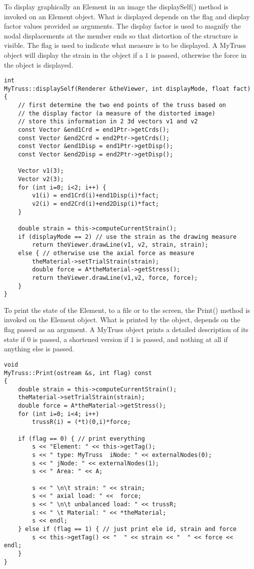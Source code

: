 \documentclass[12pt]{article}
\begin{document}
To display graphically an Element in an image the {\sf displaySelf()}
method is invoked on an Element object. What is displayed depends on
the flag and display factor values provided as arguments. The display
factor is used to magnify the nodal displacements at the member ends
so that distortion of the structure is visible. The flag is used to
indicate what measure is to be displayed. A MyTruss object will
display the strain in the object if a $1$ is passed, otherwise the
force in the object is displayed.

{\sf\small
\begin{verbatim}
int
MyTruss::displaySelf(Renderer &theViewer, int displayMode, float fact)
{
    // first determine the two end points of the truss based on
    // the display factor (a measure of the distorted image)
    // store this information in 2 3d vectors v1 and v2
    const Vector &end1Crd = end1Ptr->getCrds();
    const Vector &end2Crd = end2Ptr->getCrds();	
    const Vector &end1Disp = end1Ptr->getDisp();
    const Vector &end2Disp = end2Ptr->getDisp();    

    Vector v1(3);
    Vector v2(3);
    for (int i=0; i<2; i++) {
        v1(i) = end1Crd(i)+end1Disp(i)*fact;
        v2(i) = end2Crd(i)+end2Disp(i)*fact;    
    }

    double strain = this->computeCurrentStrain();
    if (displayMode == 2) // use the strain as the drawing measure
        return theViewer.drawLine(v1, v2, strain, strain);	
    else { // otherwise use the axial force as measure
        theMaterial->setTrialStrain(strain); 
        double force = A*theMaterial->getStress();
        return theViewer.drawLine(v1,v2, force, force);
    }
}
\end{verbatim} }

To print the state of the Element, to a file or to the screen, the
{\sf Print()} method is invoked on the Element object. What is
printed by the object, depends on the flag passed as an argument. A
MyTruss object prints a detailed description of its state if $0$ is
passed, a shortened version if $1$ is passed, and nothing at all if
anything else is passed.


{\sf\small
\begin{verbatim}
void
MyTruss::Print(ostream &s, int flag) const
{
    double strain = this->computeCurrentStrain();
    theMaterial->setTrialStrain(strain);
    double force = A*theMaterial->getStress();
    for (int i=0; i<4; i++)
        trussR(i) = (*t)(0,i)*force;

    if (flag == 0) { // print everything
        s << "Element: " << this->getTag(); 
        s << " type: MyTruss  iNode: " << externalNodes(0);
        s << " jNode: " << externalNodes(1);
        s << " Area: " << A;
	
        s << " \n\t strain: " << strain;
        s << " axial load: " <<  force;
        s << " \n\t unbalanced load: " << trussR;
        s << " \t Material: " << *theMaterial;
        s << endl;
    } else if (flag == 1) { // just print ele id, strain and force
        s << this->getTag() << "  " << strain << "  " << force << endl;
    }
}
\end{verbatim} }
\end{document}
